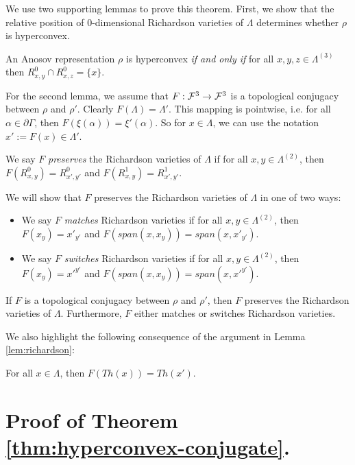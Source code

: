 We use two supporting lemmas to prove this theorem.
First, we show that the relative position of 0-dimensional Richardson varieties of 
$\Lambda$ determines whether $\rho$ is hyperconvex.
\begin{lemma}\label{lem:hyperconvex}
    An Anosov representation $\rho$ is hyperconvex \emph{if and only if} 
    for all $x,y,z \in \Lambda^{(3)}$ 
    then $R^0_{x,y} \cap R^0_{x,z} = \{x\}$.
\end{lemma}

For the second lemma, we assume that
$F:\mathcal{F}^3\rightarrow \mathcal{F}^3$ is a topological conjugacy between $\rho$ and $\rho'$. 
Clearly $F(\Lambda) = \Lambda'$. 
This mapping is pointwise, i.e. for all $\alpha \in \partial \Gamma$, 
then $F(\xi(\alpha)) = \xi'(\alpha)$. 
So for $x \in \Lambda$, we can use the notation $x' := F(x) \in \Lambda'$.

We say $F$ \emph{preserves} the Richardson varieties of $\Lambda$ 
if for all $x,y \in \Lambda^{(2)}$, then
$F(R^0_{x,y}) = R^0_{x',y'}$ and $F(R^1_{x,y}) = R^1_{x',y'}$.

We will show that $F$ preserves the Richardson varieties of $\Lambda$ in one of two ways: 
\begin{itemize}
    \item We say $F$ \emph{matches} Richardson varieties if for all $x,y\in \Lambda^{(2)}$, 
    then $F(x_y) = x'_{y'}$ and $F(span(x,x_y)) = span(x,x'_{y'})$.
    \item We say $F$ \emph{switches} Richardson varieties if for all $x,y \in \Lambda^{(2)}$, 
    then $F(x_y) = x'^{y'}$ and $F(span(x,x_y)) = span(x,x'^{y'})$.
\end{itemize}

\begin{lemma}\label{lem:richardson}
    If $F$ is a topological conjugacy between $\rho$ and $\rho'$,
    then $F$ preserves the Richardson varieties of $\Lambda$.
    Furthermore, $F$ either matches or switches Richardson varieties.
\end{lemma}

We also highlight the following consequence of the argument in Lemma \ref{lem:richardson}:
\begin{corollary}\label{cor:thick}
    For all $x \in \Lambda$, then $F(Th(x)) = Th(x')$.
\end{corollary}

\section{Proof of Theorem \ref{thm:hyperconvex-conjugate}.}

